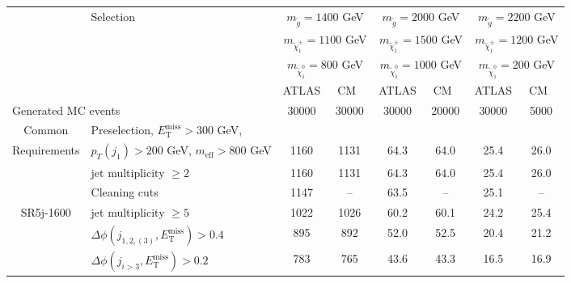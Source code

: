 \documentclass[10pt,fleqn]{article}
\newcommand{\met}{E^\mathrm{miss}_\mathrm{T}}
\newcommand{\meff}{m_\mathrm{eff}}
\begin{document}
\thispagestyle{empty}
\begin{table}[H]  \centering
 \renewcommand*{\arraystretch}{1.}
 \begin{tabular}{c|l|c|c|c|c|c|c} \toprule
      & Selection & \multicolumn{2}{c|}{$m_{\tilde{g}} = 1400$ GeV}      & \multicolumn{2}{c|}{$m_{\tilde{g}} = 2000$ GeV}         & \multicolumn{2}{c}{$m_{\tilde{g}} = 2200$ GeV}         \\ 
      &           & \multicolumn{2}{c|}{$m_{\tilde{\chi}^\pm_1} = 1100$ GeV}  & \multicolumn{2}{c|}{$m_{\tilde{\chi}^\pm_1} = 1500$ GeV}   & \multicolumn{2}{c}{$m_{\tilde{\chi}^\pm_1} = 1200$ GeV}     \\      
      &           & \multicolumn{2}{c|}{$m_{\tilde{\chi}^0_1} = 800$ GeV}  & \multicolumn{2}{c|}{$m_{\tilde{\chi}^0_1} = 1000$ GeV}   & \multicolumn{2}{c}{$m_{\tilde{\chi}^0_1} = 200$ GeV}     \\ \midrule
      &           & ATLAS             &  ~CM~~                           & ATLAS             & ~CM~~                            & ATLAS             & ~CM~~                            \\ \midrule
\multicolumn{2}{l|}{Generated MC events}                       &   30000    &   30000   &  30000     &  20000    &     30000    &   5000         \\ \midrule   
Common& Preselection, $\met > 300$ GeV,&          &   &   &  & & \\ 
Requirements & $p_T(j_1) > 200$ GeV, $\meff > 800$ GeV         &     1160   &   1131    &  64.3      &   64.0    &      25.4    &   26.0         \\
             & jet multiplicity $\geq 2$                       &     1160   &   1131    &  64.3      &   64.0    &      25.4    &   26.0         \\
             & Cleaning cuts                                   &     1147   &   --      &  63.5      &   --      &      25.1    &   --          \\ \midrule      
SR5j-1600    & jet multiplicity $\geq 5$                       &     1022   &   1026    &  60.2      &   60.1    &      24.2    &   25.4         \\
             & $\Delta\phi(j_{1,2,(3)},\met) > 0.4$            &     895    &   892     &  52.0      &   52.5    &      20.4    &   21.2         \\
             & $\Delta\phi(j_{i>3},\met) > 0.2$                &     783    &   765     &  43.6      &   43.3    &      16.5    &   16.9         \\      

\end{tabular}
\end{table}
\end{document}

